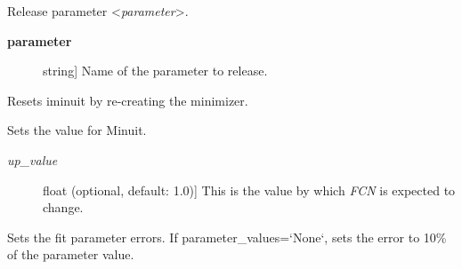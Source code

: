 \documentclass[a4paper,10pt,english]{sphinxmanual}
\begin{document}
\begin{fulllineitems}

\begin{fulllineitems}
\label{module_doc:kafe.iminuit_wrapper.IMinuit.release_parameter}
Release parameter \textless{}\emph{parameter}\textgreater{}.
\begin{description}
\item[{\textbf{parameter}}] \leavevmode{[}string{]}
Name of the parameter to release.

\end{description}

\end{fulllineitems}


\begin{fulllineitems}
\label{module_doc:kafe.iminuit_wrapper.IMinuit.reset}
Resets iminuit by re-creating the minimizer.

\end{fulllineitems}


\begin{fulllineitems}
\label{module_doc:kafe.iminuit_wrapper.IMinuit.set_err}
Sets the  value for Minuit.
\begin{description}
\item[{\emph{up\_value}}] \leavevmode{[}float (optional, default: 1.0){]}
This is the value by which \emph{FCN} is expected to change.

\end{description}

\end{fulllineitems}


\begin{fulllineitems}
\label{module_doc:kafe.iminuit_wrapper.IMinuit.set_parameter_errors}
Sets the fit parameter errors. If parameter\_values={}`None{}`, sets the
error to 10\% of the parameter value.


\end{fulllineitems}
\end{fulllineitems}
\end{document}
